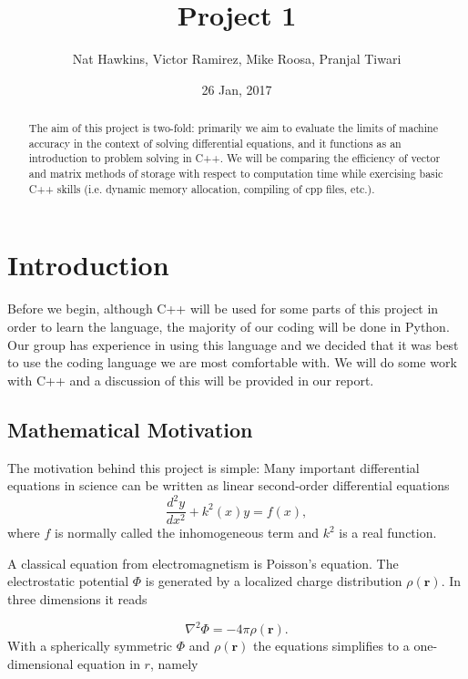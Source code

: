\documentclass{article}
\title{Project 1}
\author{Nat Hawkins, Victor Ramirez, Mike Roosa, Pranjal Tiwari}
\date{26 Jan, 2017}
\begin{document}
\maketitle

\begin{abstract}
The aim of this project is two-fold: primarily we aim to evaluate the limits of machine accuracy in the context of solving differential equations, and it functions as an introduction to problem solving in C++. We will be comparing the efficiency of vector and matrix methods of storage with respect to computation time while exercising basic C++ skills (i.e. dynamic memory allocation, compiling of cpp files, etc.). 
\end{abstract}

\section{Introduction}
	Before we begin, although C++ will be used for some parts of this project in order to learn the language, the majority of our coding will be done in Python. Our group has experience in using this language and we decided that it was best to use the coding language we are most comfortable with. We will do some work with C++ and a discussion of this will be provided in our report. 
	
	\subsection{Mathematical Motivation}
		The motivation behind this project is simple: Many important differential equations in science can be written as 	linear second-order differential equations
		\begin{equation*}
		\frac{d^2y}{dx^2}+k^2(x)y = f(x),
		\end{equation*}
		where $f$ is normally called the inhomogeneous term and $k^2$ is a real function.
		
		A classical equation from electromagnetism is Poisson's equation. The electrostatic potential $\Phi$ is generated by a localized charge distribution $\rho (\mathbf{r})$.   In three dimensions it reads
		
		\begin{equation*}
		\nabla^2 \Phi = -4\pi \rho (\mathbf{r}).
		\end{equation*}
		With a spherically symmetric $\Phi$ and $\rho (\mathbf{r})$  the equations
		simplifies to a one-dimensional equation in $r$, namely
		
\end{document}
